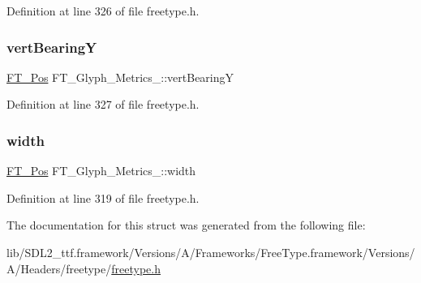Definition at line 326 of file freetype.\+h.

\mbox{\label{struct_f_t___glyph___metrics___a7f1aba91b86fddeb11030eab15dcce08}} 
\subsubsection{\texorpdfstring{vertBearingY}{vertBearingY}}
{\footnotesize\ttfamily \mbox{\hyperlink{ftimage_8h_af5f230f4b253d4c7715fd2e595614c90}{F\+T\+\_\+\+Pos}} F\+T\+\_\+\+Glyph\+\_\+\+Metrics\+\_\+\+::vert\+BearingY}



Definition at line 327 of file freetype.\+h.

\mbox{\label{struct_f_t___glyph___metrics___a0ff1be869e6a28d1f2990b0e5719dca9}} 
\subsubsection{\texorpdfstring{width}{width}}
{\footnotesize\ttfamily \mbox{\hyperlink{ftimage_8h_af5f230f4b253d4c7715fd2e595614c90}{F\+T\+\_\+\+Pos}} F\+T\+\_\+\+Glyph\+\_\+\+Metrics\+\_\+\+::width}



Definition at line 319 of file freetype.\+h.



The documentation for this struct was generated from the following file\+:\begin{DoxyCompactItemize}
\item 
lib/\+S\+D\+L2\+\_\+ttf.\+framework/\+Versions/\+A/\+Frameworks/\+Free\+Type.\+framework/\+Versions/\+A/\+Headers/freetype/\mbox{\hyperlink{freetype_8h}{freetype.\+h}}\end{DoxyCompactItemize}
